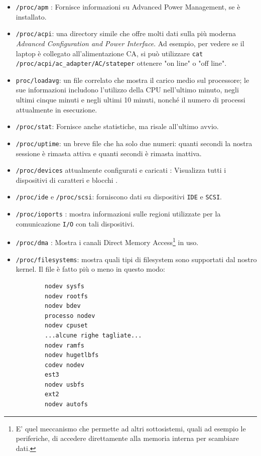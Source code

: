 \begin{itemize}
	\item  \verb*|/proc/apm| : Fornisce informazioni su Advanced Power Management, se è installato.
	\item  \verb*|/proc/acpi|: una directory simile che offre molti dati sulla più moderna \textit{Advanced Configuration and Power Interface}. Ad esempio, per vedere se il laptop è collegato all'alimentazione CA, si può utilizzare  \verb*|cat /proc/acpi/ac_adapter/AC/stateper| ottenere "on line" o "off line". 
	\item \verb*|proc/loadavg|: un file correlato che mostra il carico medio sul processore; le sue informazioni includono l'utilizzo della CPU nell'ultimo minuto, negli ultimi cinque minuti e negli ultimi 10 minuti, nonché il numero di processi attualmente in esecuzione.
	\item \verb*|/proc/stat|: Fornisce anche statistiche, ma risale all'ultimo avvio.
	\item \verb*|/proc/uptime|: un breve file che ha solo due numeri: quanti secondi la nostra sessione è rimasta attiva e quanti secondi è rimasta inattiva.
	\item \verb*|/proc/devices| attualmente configurati e caricati : Visualizza tutti i dispositivi di caratteri e blocchi . 
	\item \verb*|/proc/ide| e \verb*|/proc/scsi|: forniscono dati su dispositivi \verb*|IDE| e \verb*|SCSI|.
	\item \verb*|/proc/ioports| : mostra informazioni sulle regioni utilizzate per la comunicazione \verb*|I/O| con tali dispositivi.
	\item \verb*|/proc/dma| : Mostra i canali Direct Memory Access\footnote{E' quel meccanismo che permette ad altri sottosistemi, quali ad esempio le periferiche, di accedere direttamente alla memoria interna per scambiare dati.} in uso.
	\item \verb*|/proc/filesystems|: mostra quali tipi di filesystem sono supportati dal nostro kernel. Il file è fatto più o meno in questo modo:
	\begin{verbatim}
		nodev sysfs
		nodev rootfs
		nodev bdev
		processo nodev
		nodev cpuset
		...alcune righe tagliate...
		nodev ramfs
		nodev hugetlbfs
		codev nodev
		est3
		nodev usbfs
		ext2
		nodev autofs
	\end{verbatim}

\end{itemize}
